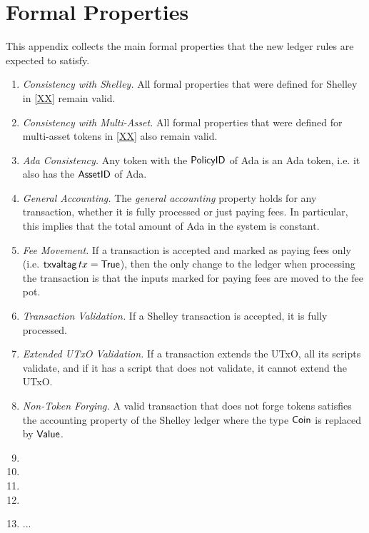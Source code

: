 \section{Formal Properties}
\label{sec:properties}

This appendix collects the main formal properties that the new ledger rules are expected to satisfy.

\begin{enumerate}[label=P{\arabic*}:\ ]
\item
  \emph{Consistency with Shelley.}
  All formal properties that were defined for Shelley in \ref{XX} remain valid.
\item
  \emph{Consistency with Multi-Asset.}
  All formal properties that were defined for multi-asset tokens in \ref{XX} also remain valid.
\item
  \emph{Ada Consistency.}
  Any token with the $\mathsf{PolicyID}$ of Ada is an Ada token, i.e. it
  also has the $\mathsf{AssetID}$ of Ada.
\item
  \emph{General Accounting.}
  The \emph{general accounting} property holds for any transaction,
  whether it is fully processed or just paying fees. In particular,
  this implies that the total amount of Ada in the system is constant.
\item
  \emph{Fee Movement.}
  If a transaction is accepted and marked as paying fees only
  (i.e. $\mathsf{txvaltag}\, tx = \mathsf{True}$), then the only change to the ledger
  when processing the transaction is that the inputs marked for paying
  fees are moved to the fee pot.
\item
  \emph{Transaction Validation.}
  If a Shelley transaction is accepted, it is fully processed.
\item
  \emph{Extended UTxO Validation.}
  If a transaction extends the UTxO, all its scripts validate, and
  if it has a script that does not validate, it cannot extend the
  UTxO.
\item
  \emph{Non-Token Forging.}
  A valid transaction that does not forge tokens satisfies the
  accounting property of the Shelley ledger where the type $\mathsf{Coin}$ is
  replaced by $\mathsf{Value}$.
\item
\item
\item
\item
\item
  ... 
\end{enumerate}
